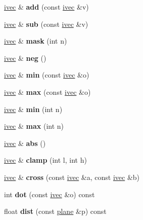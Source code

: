 \begin{DoxyCompactItemize}
\mbox{\label{structivec_a2c863e9e049642fcf82cf06b7c20dac9}} 
\hyperlink{structivec}{ivec} \& {\bfseries add} (const \hyperlink{structivec}{ivec} \&v)
\item 
\mbox{\label{structivec_a61910244bde7875c7cee44bda0423c0a}} 
\hyperlink{structivec}{ivec} \& {\bfseries sub} (const \hyperlink{structivec}{ivec} \&v)
\item 
\mbox{\label{structivec_abfead655444a425e2641d73a6b4930eb}} 
\hyperlink{structivec}{ivec} \& {\bfseries mask} (int n)
\item 
\mbox{\label{structivec_a32ef5e9a2c8a5fb7ebbbcf835be93097}} 
\hyperlink{structivec}{ivec} \& {\bfseries neg} ()
\item 
\mbox{\label{structivec_a4be4f8faedf36b1e6e07a62aef6c7bc4}} 
\hyperlink{structivec}{ivec} \& {\bfseries min} (const \hyperlink{structivec}{ivec} \&o)
\item 
\mbox{\label{structivec_aadb494bc22e15be624e7aa0330d96eb3}} 
\hyperlink{structivec}{ivec} \& {\bfseries max} (const \hyperlink{structivec}{ivec} \&o)
\item 
\mbox{\label{structivec_ae9c4ca7238cc4e7795920420bc6a211f}} 
\hyperlink{structivec}{ivec} \& {\bfseries min} (int n)
\item 
\mbox{\label{structivec_a744eaed34e5be2d8c3fbb9aa2b65b1ed}} 
\hyperlink{structivec}{ivec} \& {\bfseries max} (int n)
\item 
\mbox{\label{structivec_a13be67a9c3afb9bafa6e0e25c2a0f4ee}} 
\hyperlink{structivec}{ivec} \& {\bfseries abs} ()
\item 
\mbox{\label{structivec_aae53103a58d54a74856d291da0713964}} 
\hyperlink{structivec}{ivec} \& {\bfseries clamp} (int l, int h)
\item 
\mbox{\label{structivec_a6761d6ce3a2473a7ae8be7ab75fb2bbd}} 
\hyperlink{structivec}{ivec} \& {\bfseries cross} (const \hyperlink{structivec}{ivec} \&a, const \hyperlink{structivec}{ivec} \&b)
\item 
\mbox{\label{structivec_a72eb9c2726b8c101a07200e16ba96781}} 
int {\bfseries dot} (const \hyperlink{structivec}{ivec} \&o) const
\item 
\mbox{\label{structivec_aa6731945a8e8f0aee5353f7d8faa3a91}} 
float {\bfseries dist} (const \hyperlink{structplane}{plane} \&p) const
\end{DoxyCompactItemize}
